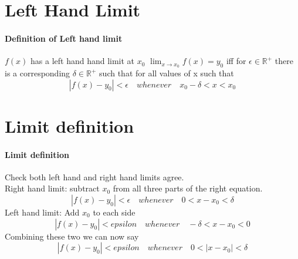 \documentclass[12pt, a4paper,oneside]{book}
\begin{document}
\section{Left Hand Limit}
\paragraph{Definition of Left hand limit}

\(f(x)\) has a left hand hand limit at \(x_0\)  \( \lim_{x \to x_0}f(x) = y_0 \) iff for \( \epsilon \in \mathbb{R^+} \) there is a corresponding \( \delta \in \mathbb{R^+} \) such that for all values of x  such that \[|f(x) - y_0| <\epsilon \quad whenever \quad x_0 -\delta < x < x_0\]


\section{Limit definition}
\paragraph{Limit definition}
\begin{paragraph}
Check both left hand and  right hand limits agree. \\
Right hand limit: subtract \(x_0\) from all three parts of the right equation.\[|f(x)-y_0|<\epsilon \quad whenever \quad 0<x-x_0<\delta\]
Left hand limit: Add \(x_0\) to each side \[|f(x)-y_0|<epsilon \quad whenever \quad -\delta < x-x_0<0\]
Combining these two we can now say
\[|f(x)-y_0|<epsilon \quad whenever \quad 0 < |x-x_0|<\delta\]
\end{paragraph}
\end{document}

